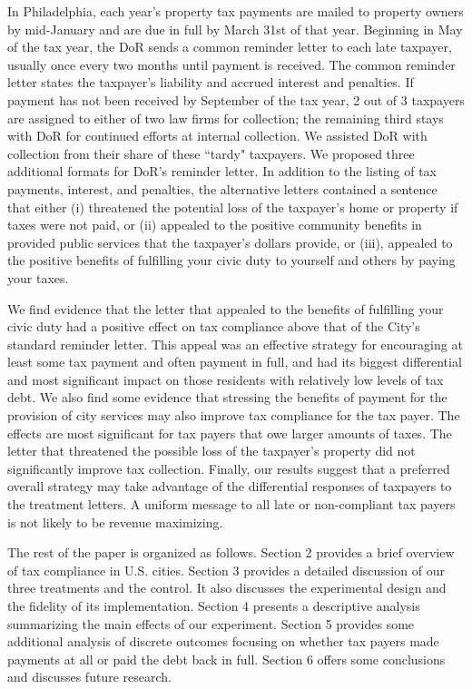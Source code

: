\documentclass[12pt,titlepage]{article}
\begin{document}
In Philadelphia, each year's property tax payments are mailed to
property owners by mid-January and are due in full by March 31st of
that year.  Beginning in May of the tax year, the DoR sends a common
reminder letter to each late taxpayer, usually once every two months
until payment is received.  The common reminder letter states the
taxpayer's liability and accrued interest and penalties.  If payment
has not been received by September of the tax year, 2 out of 3 taxpayers
are assigned  to either of two law firms for collection; the remaining third 
stays with DoR for continued efforts at internal collection.  We
assisted DoR with collection from their share of these ``tardy"
taxpayers.  We proposed three additional formats for DoR's reminder
letter.  In addition to the listing of tax payments, interest, and
penalties, the alternative letters contained a sentence that either
(i) threatened the potential loss of the taxpayer's home or property
if taxes were not paid, or (ii) appealed to the positive community
benefits in provided public services that the taxpayer's dollars
provide, or (iii), appealed to the positive benefits of fulfilling
your civic duty to yourself and others by paying your taxes.

We find evidence that the letter that appealed to the benefits of
fulfilling your civic duty had a positive 
effect on tax compliance above that of the City's standard reminder
letter.  This appeal was an effective strategy for encouraging
at least some tax payment and often payment in full, and had its
biggest differential and most significant impact on those residents
with relatively low levels of tax debt.  We also find some evidence
that stressing the benefits of payment for the provision of city
services may also improve tax compliance for the tax payer. The effects
are most significant for tax payers that owe larger
amounts of taxes. The letter that threatened the possible loss of the
taxpayer's property did not significantly improve tax
collection. Finally, our results suggest that a preferred overall
strategy may take advantage of the differential responses of taxpayers
to the treatment letters. A uniform message to all late or
non-compliant tax payers is not likely to be revenue maximizing.

The rest of the paper is organized as follows.  Section 2 provides a
brief overview of tax compliance in U.S. cities. Section 3 provides
a detailed discussion of our three treatments and the control. It also
discusses the experimental design and the fidelity of its
implementation. Section 4 presents a descriptive analysis summarizing
the main effects of our experiment.  Section 5 provides some additional
analysis of discrete outcomes focusing on whether tax payers made 
payments at all or paid the debt back in full.
Section 6 offers some conclusions and discusses future research.
\end{document}
